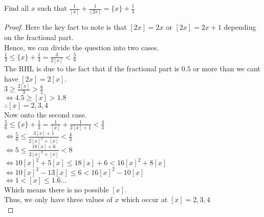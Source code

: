 \begin{example}
Find all $x$ such that $\frac{1}{[x]}+\frac{1}{[2x]}=\{x\}+\frac{1}{3}$
\end{example}
\begin{proof}
Here the key fact to note is that $[2x]=2x$ or $[2x]=2x+1$ depending on the fractional part.\\
Hence, we can divide the question into two cases.\\
$\frac{1}{3}\leq \{x\}+\frac{1}{3}=\frac{3}{2[x]} < \frac{5}{6}$\\
The RHL is due to the fact that if the fractional part is $0.5$ or more than we cant have $[2x]=2[x]$.\\
$3\geq \frac{2[x]}{3} > \frac{6}{5}$\\
$\iff 4.5 \geq [x] > 1.8$\\
$\therefore [x]={2,3,4}$\\
Now onto the second case.\\
$\frac{5}{6}\leq \{x\}+\frac{1}{3}=\frac{1}{[x]}+\frac{1}{2[x]+1} < \frac{4}{3}$\\
$\iff \frac{5}{6}\leq \frac{3[x]+1}{2[x]^2+[x]} < \frac{4}{3}$\\
$\iff 5 \leq \frac{18[x]+6}{2[x]^2+[x]} < 8$\\
$\iff 10[x]^2+5[x] \leq 18[x]+6 < 16[x]^2+8[x]$\\
$\iff 10[x]^2-13[x] \leq 6 < 16[x]^2-10[x]$\\
$\iff 1 < [x] \leq 1.6\dots$\\
Which means there is no possible $[x]$.\\
Thus, we only have three values of $x$ which occur at $[x]=2,3,4$\\
\end{proof}
